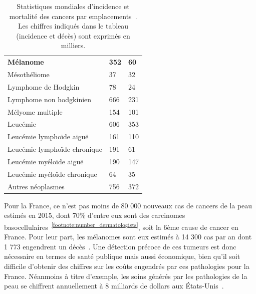 \begin{table}[H]
\begin{tabular}{lll}
    \textbf{Mélanome}                   & \textbf{352}      & \textbf{60}   \\
    Mésothéliome                        & 37                & 32            \\
    Lymphome de Hodgkin                 & 78                & 24            \\
    Lymphome non hodgkinien             & 666               & 231           \\
    Mélyome multiple                    & 154               & 101           \\
    Leucémie                            & 606               & 353           \\
    Leucémie lymphoïde aiguë            & 161               & 110           \\
    Leucémie lymphoïde chronique        & 191               & 61            \\
    Leucémie myéloïde aiguë             & 190               & 147           \\
    Leucémie myéloïde chronique         & 64                & 35            \\
    Autres néoplasmes                   & 756               & 372           \\ \bottomrule
    \end{tabular}   
    \caption{Statistiques mondiales d’incidence et mortalité des cancers par emplacements~\cite{Karimkhani2017}. Les chiffres indiqués dans le tableau (incidence et décès) sont exprimés en milliers.}
    \label{tab:introduction_cancer_incidence}
\end{table}\par

Pour la France, ce n’est pas moins de 80 000 nouveaux cas de cancers de la peau estimés en 2015, dont 70\% d'entre eux sont des carcinomes basocellulaires~\textsuperscript{\ref{footnote:number_dermatologists}}, soit la 6ème cause de cancer en France. Pour leur part, les mélanomes sont eux estimés à 14 300 cas par an dont 1 773 engendrent un décès~\cite{Thuret2012}. Une détection précoce de ces tumeurs est donc nécessaire en termes de santé publique mais aussi économique, bien qu'il soit difficile d'obtenir des chiffres sur les coûts engendrés par ces pathologies pour la France. Néanmoins à titre d'exemple, les soins générés par les pathologies de la peau se chiffrent annuellement à 8 milliards de dollars aux États-Unis~\cite{Farberg2017a}.\par

